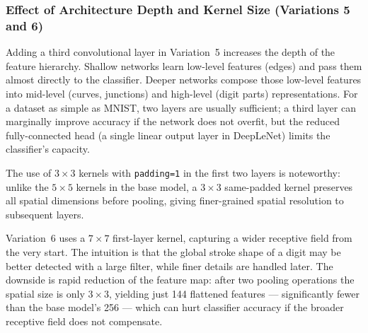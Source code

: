\documentclass[12pt, a4paper]{article}
\begin{document}

\subsubsection{Effect of Architecture Depth and Kernel Size (Variations 5 and 6)}

Adding a third convolutional layer in Variation~5 increases the depth of the feature
hierarchy. Shallow networks learn low-level features (edges) and pass them almost
directly to the classifier. Deeper networks compose those low-level features into
mid-level (curves, junctions) and high-level (digit parts) representations. For a
dataset as simple as MNIST, two layers are usually sufficient; a third layer can
marginally improve accuracy if the network does not overfit, but the reduced
fully-connected head (a single linear output layer in DeepLeNet) limits the
classifier's capacity.

The use of $3\times3$ kernels with \texttt{padding=1} in the first two layers is
noteworthy: unlike the $5\times5$ kernels in the base model, a $3\times3$ same-padded
kernel preserves all spatial dimensions before pooling, giving finer-grained spatial
resolution to subsequent layers.

Variation~6 uses a $7\times7$ first-layer kernel, capturing a wider receptive field
from the very start. The intuition is that the global stroke shape of a digit may be
better detected with a large filter, while finer details are handled later. The
downside is rapid reduction of the feature map: after two pooling operations the
spatial size is only $3\times3$, yielding just 144 flattened features --- significantly
fewer than the base model's 256 --- which can hurt classifier accuracy if the broader
receptive field does not compensate.



\end{document}

